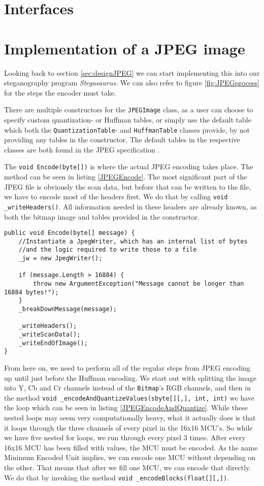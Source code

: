 \section{Interfaces}
\section{Implementation of a JPEG image}
Looking back to section \ref{sec:designJPEG} we can start implementing this into our steganography program \textit{Stegasaurus}.
We can also refer to figure \ref{fig:JPEGprocess} for the steps the encoder must take.

There are multiple constructors for the \lstinline|JPEGImage| class, as a user can choose to specify custom quantization- or Huffman tables, or simply use the default table which both the \lstinline|QuantizationTable|- and \lstinline|HuffmanTable| classes provide, by not providing any tables in the constructor.
The default tables in the respective classes are both found in the JPEG specification \citep[Annex k]{JPEGStandard}.

The \lstinline|void Encode(byte[])| is where the actual JPEG encoding takes place.
The method can be seen in listing \ref{JPEGEncode}.
The most significant part of the JPEG file is obviously the scan data, but before that can be written to the file, we have to encode most of the headers first.
We do that by calling \lstinline|void _writeHeaders()|.
All information needed in these headers are already known, as both the bitmap image and tables provided in the constructor.

\begin{lstlisting}[firstnumber=136,label=JPEGEncode]
public void Encode(byte[] message) {
    //Instantiate a JpegWriter, which has an internal list of bytes 
    //and the logic required to write those to a file
    _jw = new JpegWriter();

    if (message.Length > 16884) {
        throw new ArgumentException("Message cannot be longer than 16884 bytes!");
    }
    _breakDownMessage(message);

    _writeHeaders();
    _writeScanData();
    _writeEndOfImage();
}
\end{lstlisting}

From here on, we need to perform all of the regular steps from JPEG encoding up until just before the Huffman encoding.
We start out with splitting the image into Y, Cb and Cr channels instead of the \lstinline|Bitmap|'s RGB channels, and then in the method \lstinline|void _encodeAndQuantizeValues(sbyte[][,], int, int)| we have the loop which can be seen in listing \ref{JPEGEncodeAndQuantize}.
While these nested loops may seem very computationally heavy, what it actually does is that it loops through the three channels of every pixel in the 16x16 MCU's.
So while we have five nested for loops, we run through every pixel 3 times.
After every 16x16 MCU has been filled with values, the MCU must be encoded.
As the name Minimum Encoded Unit implies, we can encode one MCU without depending on the other.
That means that after we fill one MCU, we can encode that directly. We do that by invoking the method \lstinline|void _encodeBlocks(float[][,])|.

